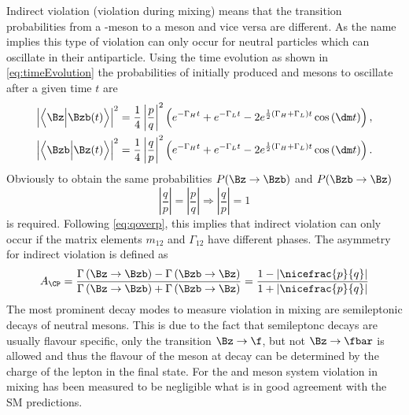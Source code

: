 Indirect \CP violation (\CP violation during mixing) means that the transition probabilities from a \Bz-meson to a \Bzb meson and vice versa are different.
As the name implies this type of \CP violation can only occur for neutral particles which can oscillate in their antiparticle.
Using the time evolution as shown in \cref{eq:timeEvolution} the probabilities of initially produced \Bz and \Bzb mesons to oscillate after a given time $t$ are
\begin{align}
\left|\left<\Bz\Big|\Bzb\!\left(t\right)\right>\right|^2=\frac{1}{4}\left|\frac{p}{q}\right|^2
\left(e^{-\Gamma_Ht}+e^{-\Gamma_Lt}-2e^{\frac{1}{2}\left(\Gamma_H+\Gamma_L\right)t}\cos\left(\dm t\right)\right),\\
\left|\left<\Bzb\Big|\Bz\!\left(t\right)\right>\right|^2=\frac{1}{4}\left|\frac{q}{p}\right|^2
\left(e^{-\Gamma_Ht}+e^{-\Gamma_Lt}-2e^{\frac{1}{2}\left(\Gamma_H+\Gamma_L\right)t}\cos\left(\dm t\right)\right).\\
\end{align}
Obviously to obtain the same probabilities $P(\Bz\to\Bzb)$ and $P(\Bzb\to\Bz)$
\begin{equation}
\left|\frac{q}{p}\right|=\left|\frac{p}{q}\right| \Rightarrow \left|\frac{q}{p}\right|=1
\end{equation}
is required.
Following \cref{eq:qoverp}, this implies that indirect \CP violation can only occur if the matrix elements $m_{12}$ and $\Gamma_{12}$ have different phases.
The \CP asymmetry for indirect \CP violation is defined as
\begin{equation}
A_{\CP}=\frac{\Gamma\left(\Bz\to\Bzb\right) - \Gamma\left(\Bzb\to\Bz\right)}{\Gamma\left(\Bz\to\Bzb\right) + \Gamma\left(\Bzb\to\Bz\right)}
= \frac{1-\left|\nicefrac{p}{q}\right|}{1+\left|\nicefrac{p}{q}\right|}
\end{equation}
The most prominent decay modes to measure \CP violation in mixing are semileptonic decays of neutral mesons.
This is due to the fact that semileptonc decays are usually flavour specific, \ie only the transition $\Bz\to\f$, but not $\Bz\to\fbar$ is allowed and thus the flavour of the meson at decay can be determined by the charge of the lepton in the final state.
For the \Bz and \Bs meson system \CP violation in mixing has been measured to be negligible \cite{HFLAV2016} what is in good agreement with the \ac{SM} predictions.

